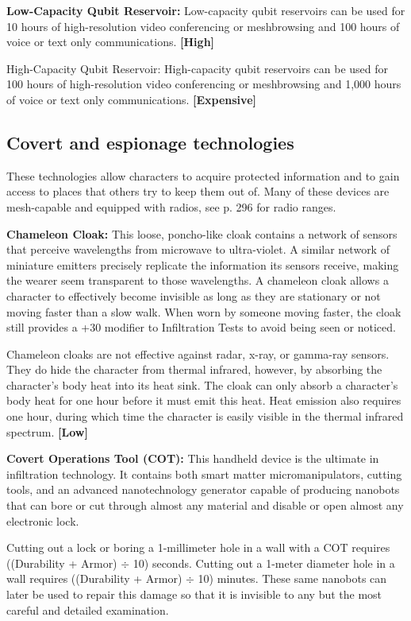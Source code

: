 \textbf{Low-Capacity Qubit Reservoir:} Low-capacity qubit reservoirs can be used for 10 hours of high-resolution video conferencing or meshbrowsing and 100 hours of voice or text only communications. \textbf{[High]} 

High-Capacity Qubit Reservoir: High-capacity qubit reservoirs can be used for 100 hours of high-resolution video conferencing or meshbrowsing and 1,000 hours of voice or text only communications. \textbf{[Expensive]} 



\subsection{Covert and espionage technologies} \label{sec:covert-espionage-tech} 

These technologies allow characters to acquire protected information and to gain access to places that others try to keep them out of. Many of these devices are mesh-capable and equipped with radios, see p. 296 for radio ranges. 

\textbf{Chameleon Cloak:} This loose, poncho-like cloak contains a network of sensors that perceive wavelengths from microwave to ultra-violet. A similar network of miniature emitters precisely replicate the information its sensors receive, making the wearer seem transparent to those wavelengths. A chameleon cloak allows a character to effectively become invisible as long as they are stationary or not moving faster than a slow walk. When worn by someone moving faster, the cloak still provides a +30 modifier to Infiltration Tests to avoid being seen or noticed. 

Chameleon cloaks are not effective against radar, x-ray, or gamma-ray sensors. They do hide the character from thermal infrared, however, by absorbing the character’s body heat into its heat sink. The cloak can only absorb a character’s body heat for one hour before it must emit this heat. Heat emission also requires one hour, during which time the character is easily visible in the thermal infrared spectrum. \textbf{[Low]} 

\textbf{Covert Operations Tool (COT):} This handheld device is the ultimate in infiltration technology. It contains both smart matter micromanipulators, cutting tools, and an advanced nanotechnology generator capable of producing nanobots that can bore or cut through almost any material and disable or open almost any electronic lock. 

Cutting out a lock or boring a 1-millimeter hole in a wall with a COT requires ((Durability + Armor) $\div$ 10) seconds. Cutting out a 1-meter diameter hole in a wall requires ((Durability + Armor) $\div$ 10) minutes. These same nanobots can later be used to repair this damage so that it is invisible to any but the most careful and detailed examination. 

